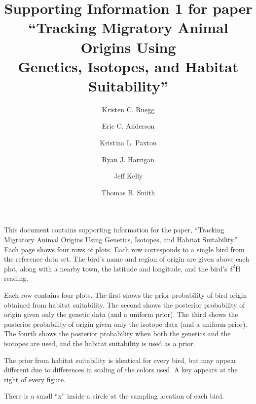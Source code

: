 \documentclass[11pt,landscape]{article}
\title{Supporting Information 1 for paper\\
``Tracking Migratory Animal Origins Using \\
Genetics, Isotopes, and Habitat Suitability''}
\author{Kristen C. Ruegg \and  
         Eric C. Anderson \and 
         Kristina L. Paxton\and 
         Ryan J. Harrigan \and
         Jeff Kelly \and
         Thomas B. Smith
         }
\begin{document}
\maketitle


This document contains supporting information for the paper, ``Tracking Migratory Animal Origins Using
Genetics, Isotopes, and Habitat Suitability.''  Each page shows four rows of plots.  Each row corresponds
to a single bird from the reference data set.  The bird's name and region of origin are given above each plot,
along with a nearby town, the latitude and longitude, and the bird's $\delta^2\mathrm{H}$ reading.  

Each row contains four plots. The first shows the prior probability of bird origin obtained from habitat suitability.
The second shows the posterior probability of origin given only the genetic data (and a uniform prior).  
The third shows the posterior probability of origin given only the isotope data (and a uniform prior).
The fourth shows
the posterior probability when both the genetics and the isotopes are used, and the habitat suitability is used as a prior.  

The prior from habitat suitability is identical for every bird, but may appear different due to differences in scaling of the 
colors used. A key appears at the right of every figure.

There is a small ``x'' inside a circle at the sampling location of each bird.
\newpage





 
\end{document}
